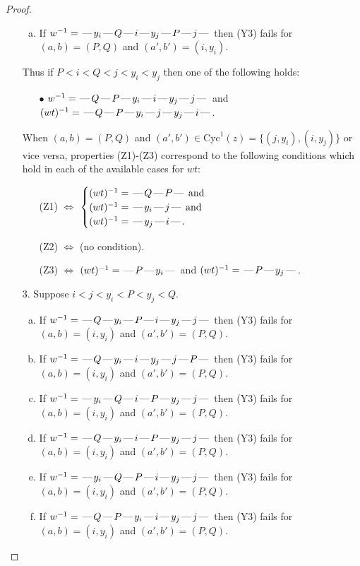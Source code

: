 \documentclass[10pt]{article}
\theoremstyle{definition}
\theoremstyle{definition}
\def\dash{\text{\hspace{0.5mm}---\hspace{0.5mm}}}
\def\Cyc{\mathrm{Cyc}}
\begin{document}
\begin{proof}
\begin{enumerate}
\begin{enumerate}[(a)]
\item If $w^{-1} = \dash y_i\dash Q\dash i\dash y_j\dash P\dash j\dash $ then (Y3) fails for $(a,b)=(P,Q)$ and $(a',b')=(i,y_i)$.
\end{enumerate}
Thus if $P < i < Q < j < y_i < y_j$ then one of the following holds:
\begin{enumerate}
\item[$\bullet$] $w^{-1} = \dash Q\dash P\dash y_i\dash i\dash y_j\dash j\dash $ and $(wt)^{-1} = \dash Q\dash P\dash y_i\dash j\dash y_j\dash i\dash $.
\end{enumerate}
When $(a,b)= (P,Q)$ and $(a',b')\in \Cyc^1(z)=\{(j,y_i),(i,y_j)\}$ or vice versa,
properties (Z1)-(Z3) correspond to the following conditions which
hold in each of the available cases for $wt$:
\begin{enumerate}
\item[](Z1) $\Leftrightarrow$ $\begin{cases}\text{$(wt)^{-1} = \dash Q \dash P \dash$}\text{ and }\\
\text{$(wt)^{-1} = \dash y_i \dash j \dash$}\text{ and }\\
\text{$(wt)^{-1} = \dash y_j \dash i \dash$}.\end{cases}$
\item[](Z2) $\Leftrightarrow$ (no condition).
\item[](Z3) $\Leftrightarrow$ $(wt)^{-1} = \dash P \dash y_i \dash$  and $(wt)^{-1} = \dash P \dash y_j \dash$.
\end{enumerate}
\item[$3$.] Suppose $i < j < y_i < P < y_j < Q$.
\begin{enumerate}[(a)]
\item If $w^{-1} = \dash Q\dash y_i\dash P\dash i\dash y_j\dash j\dash $ then (Y3) fails for $(a,b)=(i,y_i)$ and $(a',b')=(P,Q)$.
\item If $w^{-1} = \dash Q\dash y_i\dash i\dash y_j\dash j\dash P\dash $ then (Y3) fails for $(a,b)=(i,y_i)$ and $(a',b')=(P,Q)$.
\item If $w^{-1} = \dash y_i\dash Q\dash i\dash P\dash y_j\dash j\dash $ then (Y3) fails for $(a,b)=(i,y_i)$ and $(a',b')=(P,Q)$.
\item If $w^{-1} = \dash Q\dash y_i\dash i\dash P\dash y_j\dash j\dash $ then (Y3) fails for $(a,b)=(i,y_i)$ and $(a',b')=(P,Q)$.
\item If $w^{-1} = \dash y_i\dash Q\dash P\dash i\dash y_j\dash j\dash $ then (Y3) fails for $(a,b)=(i,y_i)$ and $(a',b')=(P,Q)$.
\item If $w^{-1} = \dash Q\dash P\dash y_i\dash i\dash y_j\dash j\dash $ then (Y3) fails for $(a,b)=(i,y_i)$ and $(a',b')=(P,Q)$.

\end{enumerate}
\end{enumerate}
\end{proof}
\end{document}
